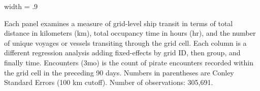 \begin{table}
\begin{adjustbox}{width = .9\textwidth}
\begin{threeparttable}
\begin{tablenotes}
Each panel examines a measure of grid-level ship transit in terms of total distance in kilometers (km), 
total occupancy time in hours (hr), and the number of unique voyages or vessels transiting through the grid cell. 
Each column is a different regression analysis adding fixed-effects by grid ID, then group, and finally time.
Encounters (3mo) is the count of pirate encounters recorded within the grid cell in the preceding 90 days.
Numbers in parentheses are Conley Standard Errors (100 km cutoff). Number of observations: 305,691.
\end{tablenotes}
\end{threeparttable}
\end{adjustbox}
\end{table}
